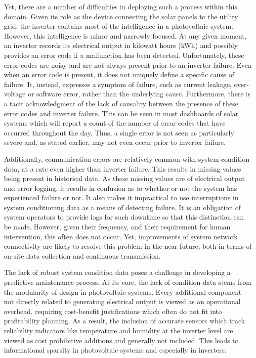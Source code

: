 Yet, there are a number of difficulties in deploying such a process within this domain. Given its role as the device connecting the solar panels to the utility grid, the inverter contains most of the intelligence in a photovoltaic system\cite{Golnas2013}. However, this intelligence is minor and narrowly focused. At any given moment, an inverter records its electrical output in kilowatt hours (kWh) and possibly provides an error code if a malfunction has been detected\cite{SMA2012}. Unfortunately, these error codes are noisy and are not always present prior to an inverter failure. Even when an error code is present, it does not uniquely define a specific cause of failure. It, instead, expresses a symptom of failure, such as current leakage, over-voltage or software error, rather than the underlying cause. Furthermore, there is a tacit acknowledgment of the lack of causality between the presence of these error codes and inverter failure. This can be seen in most dashboards of solar systems which will report a count of the number of error codes that have occurred throughout the day. Thus, a single error is not seen as particularly severe and, as stated earlier, may not even occur prior to inverter failure. 

Additionally, communication errors are relatively common with system condition data, at a rate even higher than inverter failure\cite{Golnas2013}. This results in missing values being present in historical data. As these missing values are of electrical output and error logging, it results in confusion as to whether or not the system has experienced failure or not. It also makes it impractical to use interruptions in system conditioning data as a means of detecting failure. It is an obligation of system operators to provide logs for such downtime so that this distinction can be made. However, given their frequency, and their requirement for human intervention, this often does not occur. Yet, improvements of system network connectivity are likely to resolve this problem in the near future, both in terms of on-site data collection and continuous transmission.

The lack of robust system condition data poses a challenge in developing a predictive maintenance process. At its core, the lack of condition data stems from the modularity of design in photovoltaic systems. Every additional component not directly related to generating electrical output is viewed as an operational overhead, requiring cost-benefit justifications which often do not fit into profitability planning. As a result, the inclusion of accurate sensors which track reliability indicators like temperature and humidity at the inverter level are viewed as cost prohibitive additions and generally not included. This leads to informational sparsity in photovoltaic systems and especially in inverters. 

